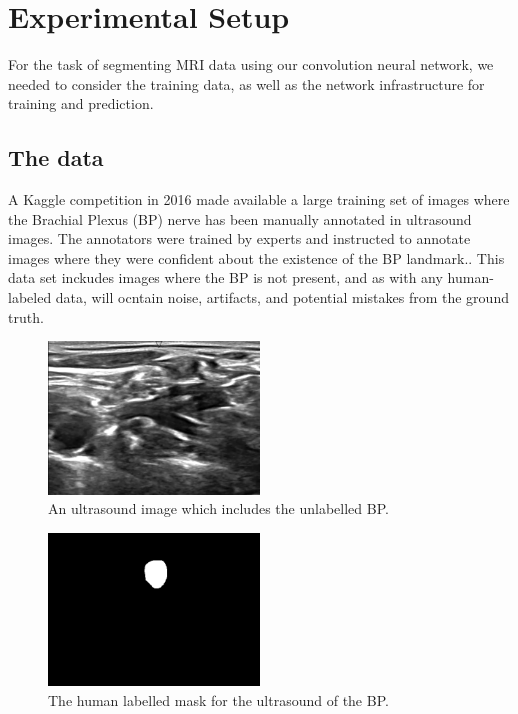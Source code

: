 \documentclass[letterpaper]{article}
\begin{document}
\section{Experimental Setup}
For the task of segmenting MRI data using our convolution neural network, we needed to consider the training data, as well as the network infrastructure for training and prediction.

\subsection{The data}
A Kaggle competition in 2016 made available a large training set of images where the Brachial Plexus (BP) nerve has been manually annotated in ultrasound images. The annotators were trained by experts and instructed to annotate images where they were confident about the existence of the BP landmark.. This data set inckudes images where the BP is not present, and as with any human-labeled data, will ocntain noise, artifacts, and potential mistakes from the ground truth. 

 \begin{figure}[H]
  \centerline{\includegraphics[width=0.5\textwidth]{Images/1_4.png}}
  \caption{An ultrasound image which includes the unlabelled BP.}
  \label{fig:BPInUltrasound}
\end{figure}

 \begin{figure}[H]
  \centerline{\includegraphics[width=0.5\textwidth]{Images/1_4_mask.png}}
  \caption{The human labelled mask for the ultrasound of the BP.}
  \label{fig:BPMask}
\end{figure}
\end{document}
